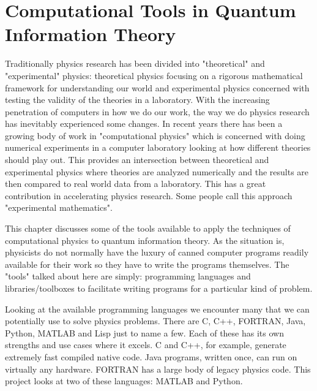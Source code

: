 \chapter{Computational Tools in Quantum Information Theory}

\par Traditionally physics research has been divided into "theoretical" and "experimental" physics: theoretical physics focusing on a rigorous mathematical framework for understanding our world and experimental physics concerned with testing the validity of the theories in a laboratory. With the increasing penetration of computers in how we do our work, the way we do physics research has inevitably experienced some changes. In recent years there has been a growing body of work in "computational physics" which is concerned with doing numerical experiments in a computer laboratory looking at how different theories should play out. This provides an intersection between theoretical and experimental physics where theories are analyzed numerically and the results are then compared to real world data from a laboratory. This has a great contribution in accelerating physics research. Some people call this approach "experimental mathematics". \cite{wolframexperimentalmath}
\par This chapter discusses some of the tools available to apply the techniques of computational physics to quantum information theory. As the situation is, physicists do not normally have the luxury of canned computer programs readily available for their work so they have to write the programs themselves. The "tools" talked about here are simply: programming languages and libraries/toolboxes to facilitate writing programs for a particular kind of problem.
\par Looking at the available programming languages we encounter many that we can potentially use to solve physics problems. There are C, C++, FORTRAN, Java, Python, MATLAB and Lisp just to name a few. Each of these has its own strengths and use cases where it excels. C and C++, for example, generate extremely fast compiled native code. Java programs, written once, can run on virtually any hardware. FORTRAN has a large body of legacy physics code. This project looks at two of these languages: MATLAB and Python.

